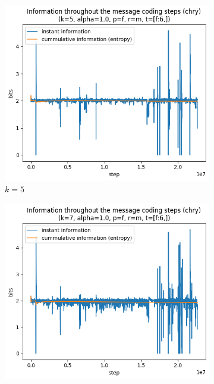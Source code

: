 \documentclass{article}
\begin{document}
\begin{figure}
    \begin{subfigure}[b]{0.3\textwidth}
        \begin{center}
            \includegraphics[width=1.0\linewidth]{../scripts/images/chry_5_1.0_f_m_[f:6,].png}
        \end{center}
        \caption{$k = 5$}
        \label{fig:results-pattern-size-5}
    \end{subfigure}
    \hfill
    \begin{subfigure}[b]{0.3\textwidth}
        \begin{center}
            \includegraphics[width=1.0\linewidth]{../scripts/images/chry_7_1.0_f_m_[f:6,].png}

\end{center}
\end{subfigure}
\end{figure}
\end{document}
